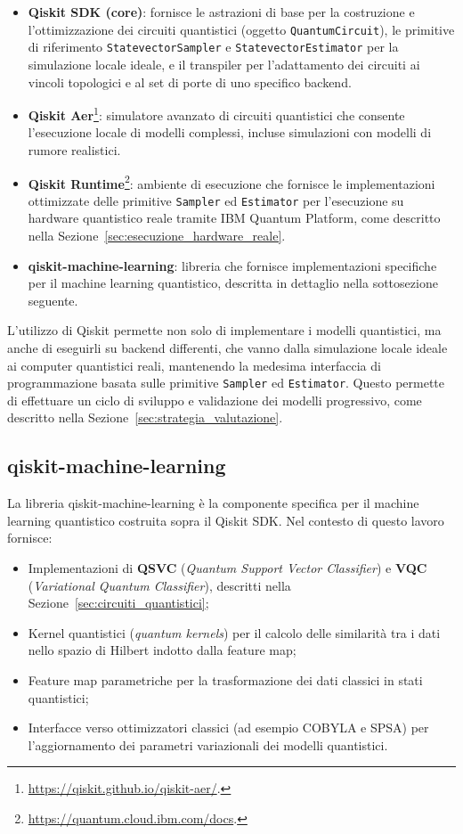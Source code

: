 \begin{itemize}
    \item \textbf{Qiskit SDK (core)}: fornisce le astrazioni di base per la costruzione e l'ottimizzazione dei circuiti quantistici (oggetto \texttt{QuantumCircuit}), le primitive di riferimento \texttt{StatevectorSampler} e \texttt{StatevectorEstimator} per la simulazione locale ideale, e il transpiler per l'adattamento dei circuiti ai vincoli topologici e al set di porte di uno specifico backend.
    \item \textbf{Qiskit Aer}\footnote{\url{https://qiskit.github.io/qiskit-aer/}.}: simulatore avanzato di circuiti quantistici che consente l'esecuzione locale di modelli complessi, incluse simulazioni con modelli di rumore realistici.
    \item \textbf{Qiskit Runtime}\footnote{\url{https://quantum.cloud.ibm.com/docs}.}: ambiente di esecuzione che fornisce le implementazioni ottimizzate delle primitive \texttt{Sampler} ed \texttt{Estimator} per l'esecuzione su hardware quantistico reale tramite IBM Quantum Platform, come descritto nella Sezione~\ref{sec:esecuzione_hardware_reale}.
    \item \textbf{qiskit-machine-learning}: libreria che fornisce implementazioni specifiche per il machine learning quantistico, descritta in dettaglio nella sottosezione seguente.
\end{itemize}

L'utilizzo di Qiskit permette non solo di implementare i modelli quantistici, ma anche di eseguirli su backend differenti, che vanno dalla simulazione locale ideale ai computer quantistici reali, mantenendo la medesima interfaccia di programmazione basata sulle primitive \texttt{Sampler} ed \texttt{Estimator}. Questo permette di effettuare un ciclo di sviluppo e validazione dei modelli progressivo, come descritto nella Sezione~\ref{sec:strategia_valutazione}.

\subsection{qiskit-machine-learning}
La libreria qiskit-machine-learning è la componente specifica per il machine learning quantistico costruita sopra il Qiskit SDK. Nel contesto di questo lavoro fornisce:
\begin{itemize}
    \item Implementazioni di \textbf{QSVC} (\textit{Quantum Support Vector Classifier}) e \textbf{VQC} (\textit{Variational Quantum Classifier}), descritti nella Sezione~\ref{sec:circuiti_quantistici};
    \item Kernel quantistici (\textit{quantum kernels}) per il calcolo delle similarità tra i dati nello spazio di Hilbert indotto dalla feature map;
    \item Feature map parametriche per la trasformazione dei dati classici in stati quantistici;
    \item Interfacce verso ottimizzatori classici (ad esempio COBYLA e SPSA) per l'aggiornamento dei parametri variazionali dei modelli quantistici.
\end{itemize}

